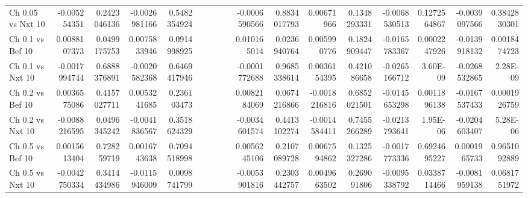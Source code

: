 \begin{table*}
{\begin{tabular}{l|n{5}{2}n{5}{2}|n{5}{2}n{5}{2}|n{5}{2}n{5}{2}|n{5}{2}n{5}{2}|n{5}{2}n{5}{2}|n{5}{2}n{5}{2}|n{5}{2}n{5}{2}|n{5}{2}n{5}{2}|}
Ch 0.05 vs Nxt 10                    & -0.005254351                                & 0.2423046136                      & -0.0026981166                      & 0.5482354924  &&&&                    & -0.0006590566 & 0.8834017793 & 0.00671966    & 0.1348293331 & -0.0068530513 & 0.1272564867 & -0.0039097566 & 0.3842830301              \\
Ch 0.1 vs Bef 10                     & 0.0088107373                                & 0.0499175753                      & 0.0075833946                       & 0.0914998925 &&&&                     & 0.010165014   & 0.0236940764 & 0.005990776   & 0.1824909447 & -0.0165783367 & 0.0002247926 & -0.0139918132 & 0.0018474723         \\
Ch 0.1 vs Nxt 10                     & -0.0017994744                               & 0.6888376891                      & -0.0020582368                      & 0.6469417946 &&&&                     & -0.0001772688 & 0.9685338614 & 0.0036154395  & 0.421086658  & -0.0265166712 & 3.60E-09     & -0.0268532865 & 2.28E-09              \\
Ch 0.2 vs Bef 10                     & 0.0036575086                                & 0.4157027711                      & 0.0053241685                       & 0.236103473 &&&&                      & 0.0082184069  & 0.0674216866 & -0.0018216816 & 0.6852021501 & -0.0145653298 & 0.0011896138 & -0.0167537433 & 0.0001926759             \\
Ch 0.2 vs Nxt 10                     & -0.0088216595                               & 0.0496345242                      & -0.0041836567                      & 0.3518624329 &&&&                     & -0.0034601574 & 0.4413102274 & -0.0014584411 & 0.7455266289 & -0.0213793641 & 1.95E-06     & -0.0204603407 & 5.28E-06         \\
Ch 0.5 vs Bef 10                     & 0.0015613404                                & 0.728259719                       & 0.0016743638                       & 0.7094518998 &&&&                     & 0.0056245106  & 0.2107089728 & 0.0067594862  & 0.1325327286 & -0.0017773336 & 0.6924695227 & 0.0001965733  & 0.9651092889      \\
Ch 0.5 vs Nxt 10                     & -0.0042750334                               & 0.3414434986                      & -0.0115946009                      & 0.0098741799 &&&&                     & -0.0053901816 & 0.2303442757 & 0.0049663502  & 0.269091806  & -0.0095338792 & 0.0338714466 & -0.0081959138 & 0.0681751972         
\end{tabular}
}
\end{table*}